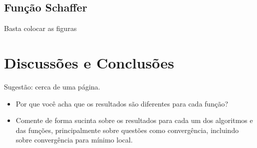 \documentclass[brazil, 12pt]{article}
\begin{document}
\subsection{Função Schaffer}
Basta colocar as figuras


\section{Discussões e Conclusões}
Sugestão: cerca de uma página.

\begin{itemize}
  \item Por que você acha que os resultados são diferentes para cada função?
  \item Comente de forma sucinta sobre os resultados para cada um dos algoritmos e das funções, principalmente sobre questões como convergência, incluindo sobre convergência para mínimo local.
  
\end{itemize}
\end{document}
